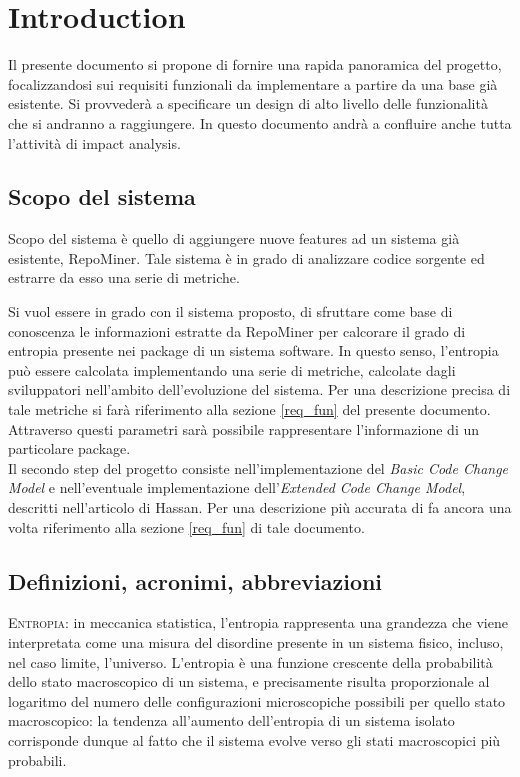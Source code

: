 \chapter{Introduction}
Il presente documento si propone di fornire una rapida panoramica del progetto, focalizzandosi sui requisiti funzionali da implementare a partire da una base già esistente. Si provvederà a specificare un design di alto livello delle funzionalità che si andranno a raggiungere. In questo documento andrà a confluire anche tutta l'attività di impact analysis.

\section{Scopo del sistema}
Scopo del sistema è quello di aggiungere nuove features ad un sistema già esistente, RepoMiner. Tale sistema è in grado di analizzare codice sorgente ed estrarre da esso una serie di metriche. 

Si vuol essere in grado con il sistema proposto, di sfruttare come base di conoscenza le informazioni estratte da RepoMiner per calcorare il grado di entropia presente nei package di un sistema software. In questo senso, l'entropia può essere calcolata implementando una serie di metriche, calcolate dagli sviluppatori nell'ambito dell'evoluzione del sistema. Per una descrizione precisa di tale metriche si farà riferimento alla sezione \ref{req_fun} del presente documento. Attraverso questi parametri sarà possibile rappresentare l'informazione di un particolare package.\\

Il secondo step del progetto consiste nell'implementazione del \textit{Basic Code Change Model} e nell'eventuale implementazione dell'\textit{Extended Code Change Model}, descritti nell'articolo di Hassan\cite{hassan2009predicting}. Per una descrizione più accurata di fa ancora una volta riferimento alla sezione \ref{req_fun} di tale documento.

\section{Definizioni, acronimi, abbreviazioni}

\textsc{Entropia}: in meccanica statistica, l'entropia rappresenta una grandezza che viene interpretata come una misura del disordine presente in un sistema fisico, incluso, nel caso limite, l'universo. L'entropia è una funzione crescente della probabilità dello stato macroscopico di un sistema, e precisamente risulta proporzionale al logaritmo del numero delle configurazioni microscopiche possibili per quello stato macroscopico: la tendenza all'aumento dell'entropia di un sistema isolato corrisponde dunque al fatto che il sistema evolve verso gli stati macroscopici più probabili. \\

